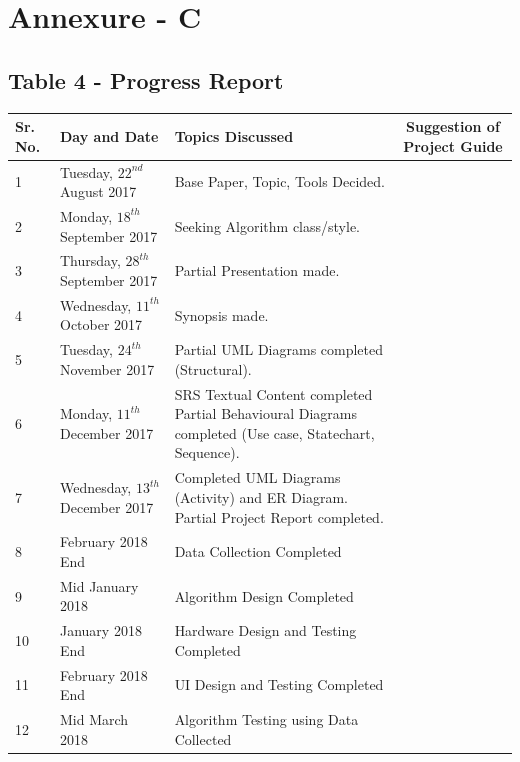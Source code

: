 \documentclass[12pt,a4paper,final]{report}
\DeclareRobustCommand{\gobblefive}[5]{}
\newcommand*{\SkipTocEntry}{\addtocontents{toc}{\gobblefive}}
\begin{document}
\newpage

\SkipTocEntry\chapter{Annexure - C}
\thispagestyle{empty}
\newpage
\vspace*{2cm}
\section*{Table 4 - Progress Report}
\begin{table}[!ht]
	\centering
	\begin{tabular}{| p{0.7cm} | p{2.8cm} | p{7cm} | c |}
		\toprule
		Sr. No. & Day and Date & Topics Discussed & Suggestion of Project Guide \\
		\midrule
		1 & Tuesday, $22^{nd}$ August 2017 & Base Paper, Topic, Tools Decided. & \\
		2 & Monday, $18^{th}$ September 2017 & Seeking Algorithm class/style. & \\
		3 & Thursday, $28^{th}$ September 2017 & Partial Presentation made. & \\
		4 & Wednesday, $11^{th}$ October 2017 & Synopsis made. & \\
		5 & Tuesday, $24^{th}$ November 2017 & Partial UML Diagrams completed (Structural). & \\
		6 & Monday, $11^{th}$ December 2017 & SRS Textual Content completed Partial Behavioural Diagrams completed (Use case, Statechart, Sequence). & \\
		7 & Wednesday, $13^{th}$ December 2017 & Completed UML Diagrams (Activity) and ER Diagram. Partial Project Report completed. & \\
        8 & February 2018 End & Data Collection Completed & \\
        9 & Mid January 2018 & Algorithm Design Completed & \\
        10 & January 2018 End & Hardware Design and Testing Completed & \\
        11 & February 2018 End & UI Design and Testing Completed & \\
        12 & Mid March 2018 & Algorithm Testing using Data Collected & \\
		\bottomrule
	\end{tabular}
\end{table}
\end{document}
